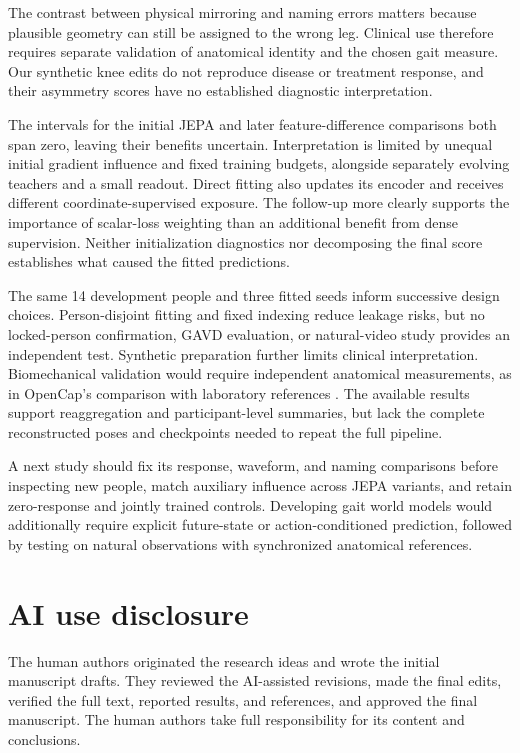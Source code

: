 \documentclass{article}
\begin{document}
The contrast between physical mirroring and naming errors matters because plausible geometry can still be assigned to the wrong leg. Clinical use therefore requires separate validation of anatomical identity and the chosen gait measure. Our synthetic knee edits do not reproduce disease or treatment response, and their asymmetry scores have no established diagnostic interpretation.

The intervals for the initial JEPA and later feature-difference comparisons both span zero, leaving their benefits uncertain. Interpretation is limited by unequal initial gradient influence and fixed training budgets, alongside separately evolving teachers and a small readout. Direct fitting also updates its encoder and receives different coordinate-supervised exposure. The follow-up more clearly supports the importance of scalar-loss weighting than an additional benefit from dense supervision. Neither initialization diagnostics nor decomposing the final score establishes what caused the fitted predictions.

The same 14 development people and three fitted seeds inform successive design choices. Person-disjoint fitting and fixed indexing reduce leakage risks, but no locked-person confirmation, GAVD evaluation, or natural-video study provides an independent test. Synthetic preparation further limits clinical interpretation. Biomechanical validation would require independent anatomical measurements, as in OpenCap's comparison with laboratory references \citep{uhlrich2023opencap}. The available results support reaggregation and participant-level summaries, but lack the complete reconstructed poses and checkpoints needed to repeat the full pipeline.

A next study should fix its response, waveform, and naming comparisons before inspecting new people, match auxiliary influence across JEPA variants, and retain zero-response and jointly trained controls. Developing gait world models would additionally require explicit future-state or action-conditioned prediction, followed by testing on natural observations with synchronized anatomical references.

\label{maintextend}
\clearpage
\section*{AI use disclosure}
The human authors originated the research ideas and wrote the initial manuscript drafts. They reviewed the AI-assisted revisions, made the final edits, verified the full text, reported results, and references, and approved the final manuscript. The human authors take full responsibility for its content and conclusions.
\end{document}
